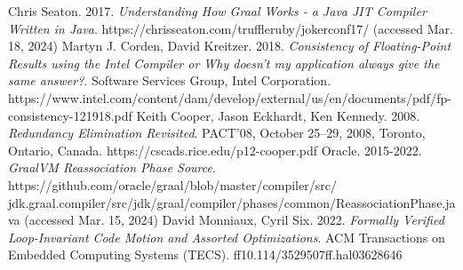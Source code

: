 \documentclass[12pt,openany,a4paper]{book}
\begin{document}
\begin{thebibliography}{99}
 Chris Seaton. 2017. \emph{Understanding How Graal Works - a Java JIT Compiler Written in Java}. https://chrisseaton.com/truffleruby/jokerconf17/ (accessed Mar. 18, 2024)
 Martyn J. Corden, David Kreitzer. 2018. \emph{Consistency of Floating-Point Results using the Intel Compiler or Why doesn't my application always give the same answer?}. Software Services Group, Intel Corporation. https://www.intel.com/content/dam/develop/external/us/en/documents/pdf/fp-consistency-121918.pdf
 Keith Cooper, Jason Eckhardt, Ken Kennedy. 2008. \emph{Redundancy Elimination Revisited}. PACT’08, October 25–29, 2008, Toronto, Ontario, Canada. https://cscads.rice.edu/p12-cooper.pdf
 Oracle. 2015-2022. \emph{GraalVM Reassociation Phase Source}. https://github.com/oracle/graal/blob/master/compiler/src/\\jdk.graal.compiler/src/jdk/graal/compiler/phases/common/ReassociationPhase.java (accessed Mar. 15, 2024)
 David Monniaux, Cyril Six. 2022. \emph{Formally Verified Loop-Invariant Code Motion and Assorted Optimizations}. ACM Transactions on Embedded Computing Systems (TECS). ff10.114/3529507ff.hal03628646
\end{thebibliography}
\end{document}
